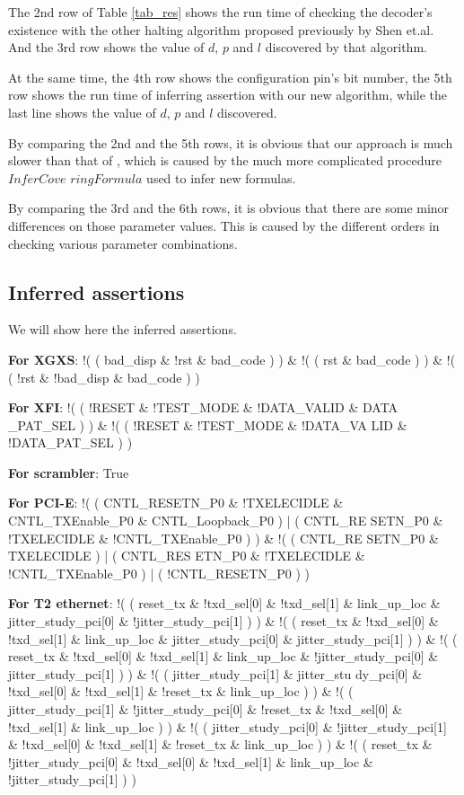 \documentclass{acm_proc_article-sp}
\begin{document}
The 2nd row of Table \ref{tab_res} shows the run time of checking the decoder's existence
with the other halting algorithm proposed previously by Shen et.al\cite{ShengYuShen:fmcad10}.
And the 3rd row shows the value of $d$, $p$ and $l$ discovered by that algorithm.

At the same time,
the 4th row shows the configuration pin's bit number,
the 5th row shows the run time of inferring assertion with our new algorithm,
while the last line shows the value of $d$, $p$ and $l$ discovered.

By comparing the 2nd and the 5th rows,
it is obvious that our approach is much slower than that of \cite{ShengYuShen:fmcad10},
which is caused by the much more complicated procedure $InferCove$ $ringFormula$
used to infer new formulas.

By comparing the 3rd and the 6th rows,
it is obvious that there are some minor differences on those parameter values.
This is caused by the different orders in checking various parameter combinations.

\subsection{Inferred assertions}
We will show here the inferred assertions.

\textbf{For XGXS}:
!( ( bad\_disp \& !rst \& bad\_code ) ) \& !( ( rst \& bad\_code ) ) \& !( ( !rst \& !bad\_disp \& bad\_code ) )
 
\textbf{For XFI}:
!( ( !RESET \& !TEST\_MODE \& !DATA\_VALID \& DATA \_PAT\_SEL ) ) \& !( ( !RESET \& !TEST\_MODE \& !DATA\_VA LID \& !DATA\_PAT\_SEL ) )

\textbf{For scrambler}:
True

\textbf{For PCI-E}:
!( ( CNTL\_RESETN\_P0 \& !TXELECIDLE \& CNTL\_TXEnable\_P0 \& CNTL\_Loopback\_P0 ) | ( CNTL\_RE SETN\_P0 \& !TXELECIDLE \& !CNTL\_TXEnable\_P0 ) ) \& !( ( CNTL\_RE SETN\_P0 \& TXELECIDLE ) | ( CNTL\_RES ETN\_P0 \& !TXELECIDLE \& !CNTL\_TXEnable\_P0 ) | ( !CNTL\_RESETN\_P0 ) )

\textbf{For T2 ethernet}:
!( ( reset\_tx \& !txd\_sel[0] \& !txd\_sel[1] \& link\_up\_loc \& jitter\_study\_pci[0] \& !jitter\_study\_pci[1] ) ) \& !( ( reset\_tx \& !txd\_sel[0] \& !txd\_sel[1] \& link\_up\_loc \& jitter\_study\_pci[0] \& jitter\_study\_pci[1] ) ) \& !( ( reset\_tx \& !txd\_sel[0] \& !txd\_sel[1] \& link\_up\_loc \& !jitter\_study\_pci[0] \& jitter\_study\_pci[1] ) ) \& !( ( jitter\_study\_pci[1] \& jitter\_stu dy\_pci[0] \& !txd\_sel[0] \& !txd\_sel[1] \& !reset\_tx \& link\_up\_loc ) ) \& !( ( jitter\_study\_pci[1] \& !jitter\_study\_pci[0] \& !reset\_tx \& !txd\_sel[0] \& !txd\_sel[1] \& link\_up\_loc ) ) \& !( ( jitter\_study\_pci[0] \& !jitter\_study\_pci[1] \& !txd\_sel[0] \& !txd\_sel[1] \& !reset\_tx \& link\_up\_loc ) ) \& !( ( reset\_tx \& !jitter\_study\_pci[0] \& !txd\_sel[0] \& !txd\_sel[1] \& link\_up\_loc \& !jitter\_study\_pci[1] ) )
\end{document}
